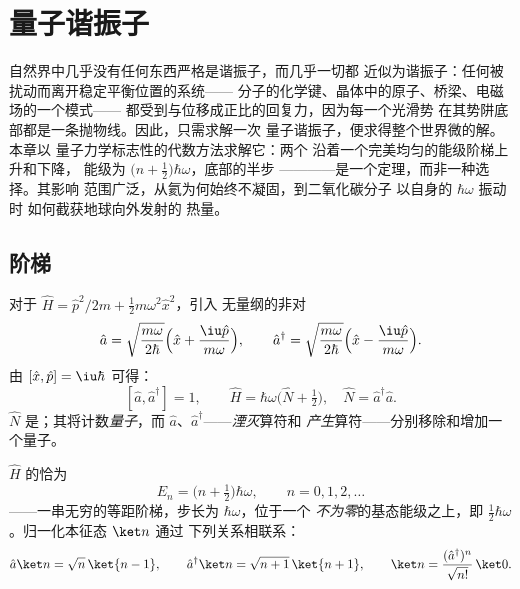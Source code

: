 \chapter{量子谐振子}\label{ch:b3:harmonic-oscillator}

自然界中几乎没有任何东西严格是谐振子，而几乎一切都
近似为谐振子：任何被扰动而离开稳定平衡位置的系统——
分子的化学键、晶体中的原子、桥梁、电磁场的一个模式——
都受到与位移成正比的回复力，因为每一个光滑势
在其势阱底部都是一条抛物线。因此，只需求解一次
量子谐振子，便求得整个世界微的解。本章以
量子力学标志性的代数方法求解它：两个
沿着一个完美均匀的能级阶梯上升和下降，
能级为 $\big(n +
\tfrac12\big)\hbar\omega$，底部的半步
————是一个定理，而非一种选择。其影响
范围广泛，从氦为何始终不凝固，到二氧化碳分子
以自身的 $\hbar\omega$ 振动时
如何截获地球向外发射的
热量。

\section{阶梯}

\begin{definition}[升降算符]\label{def:b3:harmonic-oscillator:ladder}
对于 $\hat H = \hat p^2/2m + \tfrac12 m\omega^2\hat x^2$，引入
无量纲的非对
\[
\hat a = \sqrt{\frac{m\omega}{2\hbar}}\Big(\hat x +
\frac{\iu\hat p}{m\omega}\Big) , \qquad
\hat a^\dagger = \sqrt{\frac{m\omega}{2\hbar}}\Big(\hat x -
\frac{\iu\hat p}{m\omega}\Big) .
\]
由 $[\hat x, \hat p] = \iu\hbar$ 可得：
\[
[\hat a, \hat a^\dagger] = 1 , \qquad
\hat H = \hbar\omega\Big(\hat N + \tfrac12\Big) , \quad
\hat N = \hat a^\dagger\hat a .
\]
$\hat N$ 是；其将计数\emph{量子}，而
$\hat a$、$\hat a^\dagger$——\emph{湮灭}算符和
\emph{产生}算符——分别移除和增加一个量子。
\end{definition}

\begin{theorem}[仅由代数得到的谱]\label{thm:b3:harmonic-oscillator:spectrum}
$\hat H$ 的恰为
\[
E_n = \Big(n + \tfrac12\Big)\hbar\omega , \qquad n = 0, 1, 2, \dots
\]
——一串无穷的等距阶梯，步长为 $\hbar\omega$，位于一个
\emph{不为零}的基态能级之上，即\emph{}
$\tfrac12\hbar\omega$。归一化本征态 $\ket n$ 通过
下列关系相联系：
\[
\hat a\ket n = \sqrt n\,\ket{n - 1} , \qquad
\hat a^\dagger\ket n = \sqrt{n + 1}\,\ket{n + 1} ,
\qquad
\ket n = \frac{(\hat a^\dagger)^n}{\sqrt{n!}}\,\ket0 .
\]
\end{theorem}

